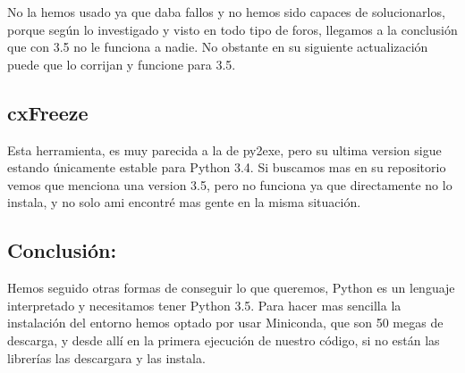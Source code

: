 No la hemos usado ya que daba fallos y no hemos sido capaces de solucionarlos, porque según lo investigado y visto en todo tipo de foros, llegamos a la conclusión que con 3.5 no le funciona a nadie.
No obstante en su siguiente actualización puede que lo corrijan y funcione para 3.5.

\subsection{cxFreeze}
Esta herramienta, es muy parecida a la de py2exe, pero su ultima version sigue estando únicamente estable para Python 3.4. 
Si buscamos mas en su repositorio vemos que menciona una version 3.5, pero no funciona ya que directamente no lo instala, y no solo ami encontré mas gente en la misma situación.

\subsection{Conclusión:}
Hemos seguido otras formas de conseguir lo que queremos, Python es un lenguaje interpretado y necesitamos tener Python 3.5.
Para hacer mas sencilla la instalación del entorno hemos optado por usar Miniconda, que son 50 megas de descarga, y desde allí en la primera ejecución de nuestro código, si no están las librerías las descargara y las instala.
